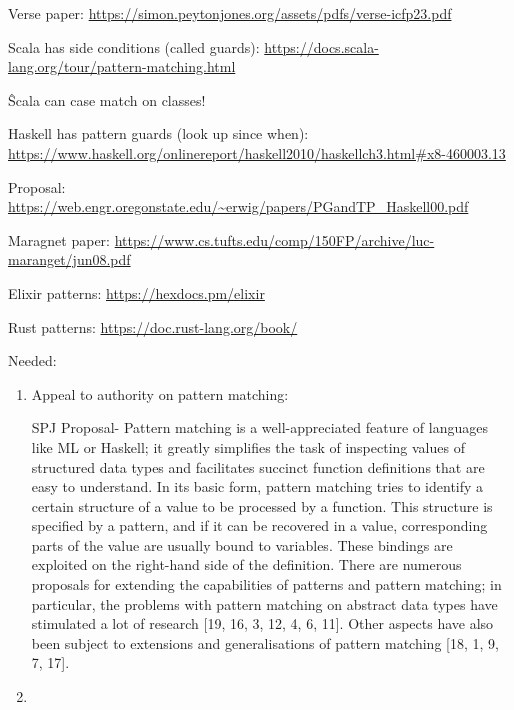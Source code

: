 \documentclass{article}
\begin{document}
Verse paper: 
\url{https://simon.peytonjones.org/assets/pdfs/verse-icfp23.pdf}

Scala has side conditions (called guards): 
\url{https://docs.scala-lang.org/tour/pattern-matching.html}

\^ Scala can case match on classes! 

Haskell has pattern guards (look up since when): 
    \url{https://www.haskell.org/onlinereport/haskell2010/haskellch3.html#x8-460003.13}


Proposal: 
\url{https://web.engr.oregonstate.edu/~erwig/papers/PGandTP_Haskell00.pdf}

Maragnet paper: 
\url{https://www.cs.tufts.edu/comp/150FP/archive/luc-maranget/jun08.pdf}

Elixir patterns: 
\url{https://hexdocs.pm/elixir}

Rust patterns:
\url{https://doc.rust-lang.org/book/}

Needed: 
\begin{enumerate}
    \item Appeal to authority on pattern matching: 
    
    SPJ Proposal- Pattern matching is a well-appreciated feature of languages
    like ML or Haskell; it greatly simplifies the task of inspecting values of
    structured data types and facilitates succinct function definitions that are
    easy to understand. In its basic form, pattern matching tries to identify a
    certain structure of a value to be processed by a function. This structure
    is specified by a pattern, and if it can be recovered in a value,
    corresponding parts of the value are usually bound to variables. These
    bindings are exploited on the right-hand side of the definition. There are
    numerous proposals for extending the capabilities of patterns and pattern
    matching; in particular, the problems with pattern matching on abstract
    data types have stimulated a lot of research [19, 16, 3, 12, 4, 6, 11].
    Other aspects have also been subject to extensions and generalisations of
    pattern matching [18, 1, 9, 7, 17].
    \item 
\end{enumerate}
\end{document}
